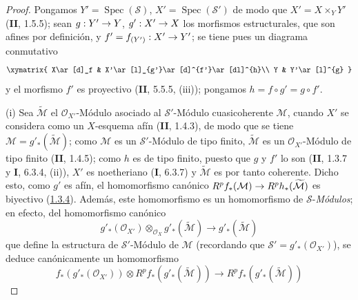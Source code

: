 \documentclass[10pt,oneside,openany]{book}
\theoremstyle{egaenv}\newtheorem*{env}{---}
\theoremstyle{egastatement}
\theoremstyle{egadescription}
\renewcommand{\to}{\mathchoice{\longrightarrow}{\rightarrow}{\rightarrow}{\rightarrow}}
\begin{document}
\begin{proof}
Pongamos $Y'=\operatorname{Spec}(\mathcal S)$,
$X'=\operatorname{Spec}(\mathcal S')$ de modo que
$X'=X\times_Y Y'$ (\textbf{II}, 1.5.5); sean $g:Y'\to Y$,
$g':X'\to X$ los morfismos estructurales, que son afines por
definición, y $f'=f_{(Y')}:X'\to Y'$; se tiene pues un diagrama
conmutativo
\[
\xymatrix{
X\ar[d]_f & X'\ar[l]_{g'}\ar[d]^{f'}\ar[dl]^{h}\\
Y & Y'\ar[l]^{g}
}
\]
y el morfismo $f'$ es proyectivo (\textbf{II}, 5.5.5, (iii)); pongamos
$h=f\circ g'=g\circ f'$.

(i) Sea $\widetilde{\mathcal M}$ el $\mathcal O_{X'}$-Módulo asociado al
$\mathcal S'$-Módulo cuasicoherente $\mathcal M$, cuando $X'$ se
considera como un $X$-esquema afín (\textbf{II}, 1.4.3), de modo que se tiene
$\mathcal M=g'_*(\widetilde{\mathcal M})$; como $\mathcal M$ es un
$\mathcal S'$-Módulo de tipo finito, $\widetilde{\mathcal M}$ es un
$\mathcal O_{X'}$-Módulo de tipo finito (\textbf{II}, 1.4.5); como $h$ es de tipo
finito, puesto que $g$ y $f'$ lo son (\textbf{II}, 1.3.7 y \textbf{I}, 6.3.4, (ii)), $X'$ es
noetheriano (\textbf{I}, 6.3.7) y $\widetilde{\mathcal M}$ es por tanto coherente.
Dicho esto, como $g'$ es afín, el homomorfismo canónico
$R^pf_*(\mathcal M)\to R^ph_*(\widetilde{\mathcal M})$ es biyectivo
(\hyperref[III.1.3.4-fr]{1.3.4}). Además, este homomorfismo es un
homomorfismo de $\mathcal S$-\emph{Módulos}; en efecto, del homomorfismo
canónico
\[
g'_*(\mathcal O_{X'})\otimes_{\mathcal O_X}
g'_*(\widetilde{\mathcal M})\longrightarrow
g'_*(\widetilde{\mathcal M})
\tag{2.4.1.2}\label{III.2.4.1.2-fr}
\]
que define la estructura de $\mathcal S'$-Módulo de $\mathcal M$ (recordando
que $\mathcal S'=g'_*(\mathcal O_{X'})$), se deduce
canónicamente un homomorfismo
\[
f_*(g'_*(\mathcal O_{X'}))\otimes
R^pf_*(g'_*(\widetilde{\mathcal M}))\longrightarrow
R^pf_*(g'_*(\widetilde{\mathcal M}))
\]


\end{proof}
\end{document}
